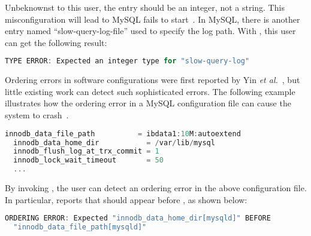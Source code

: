 Unbeknownst to this user, the entry  should be an 
integer, not a string. This misconfiguration will lead to 
MySQL fails to start~\cite{querylog}. In MySQL, there is another entry 
named ``slow-query-log-file'' used to specify the log path.
With \app, this user can get the following result:

\begin{lstlisting}[language=C, xleftmargin=.01\textwidth]
TYPE ERROR: Expected an integer type for "slow-query-log"
\end{lstlisting} 

Ordering errors in software configurations were first reported by 
Yin {\em et al.}~\cite{yin11anempirical}, but little existing work
can detect such sophisticated errors. The following example
illustrates how the ordering error in a MySQL configuration file
can cause the system to crash~\cite{innod-ordering}. 

\begin{lstlisting}[language=C, xleftmargin=.01\textwidth]
  innodb_data_file_path          = ibdata1:10M:autoextend
  innodb_data_home_dir           = /var/lib/mysql
  innodb_flush_log_at_trx_commit = 1
  innodb_lock_wait_timeout       = 50
  ... 
\end{lstlisting}

By invoking \app, the user can detect an ordering error in the
above configuration file.
In particular, \app reports that  
should appear before , as shown
below:
 
\begin{lstlisting}[language=C, xleftmargin=.01\textwidth]
ORDERING ERROR: Expected "innodb_data_home_dir[mysqld]" BEFORE
  "innodb_data_file_path[mysqld]" 
\end{lstlisting} 


